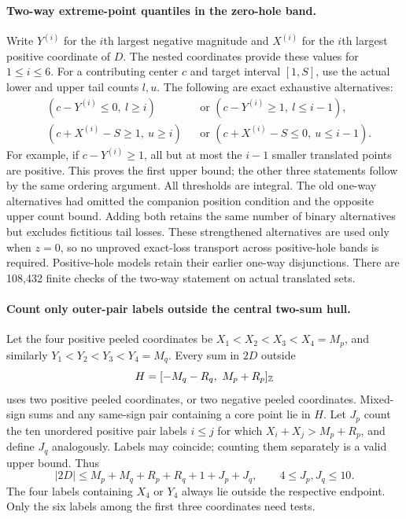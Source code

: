 \documentclass[11pt,a4paper]{article}
\begin{document}
\paragraph{Two-way extreme-point quantiles in the zero-hole band.}
Write $Y^{(i)}$ for the $i$th largest negative magnitude and $X^{(i)}$
for the $i$th largest positive coordinate of $D$. The nested coordinates
provide these values for $1\le i\le6$. For a contributing center $c$ and
target interval $[1,S]$, use the actual lower and upper tail counts $l,u$.
The following are exact exhaustive alternatives:
\begin{align*}
 &(c-Y^{(i)}\le0,\ l\ge i)
       &&\text{or }(c-Y^{(i)}\ge1,\ l\le i-1),\\
 &(c+X^{(i)}-S\ge1,\ u\ge i)
       &&\text{or }(c+X^{(i)}-S\le0,\ u\le i-1).
\end{align*}
For example, if $c-Y^{(i)}\ge1$, all but at most the $i-1$ smaller
translated points are positive. This proves the first upper bound; the
other three statements follow by the same ordering argument. All thresholds
are integral. The old one-way alternatives had omitted the companion
position condition and the opposite upper count bound. Adding both retains
the same number of binary alternatives but excludes fictitious tail losses.
These strengthened alternatives are used only when $z=0$, so no unproved
exact-loss transport across positive-hole bands is required. Positive-hole
models retain their earlier one-way disjunctions. There are 108,432 finite
checks of the two-way statement on actual translated sets.

\paragraph{Count only outer-pair labels outside the central two-sum hull.}
Let the four positive peeled coordinates be $X_1<X_2<X_3<X_4=M_p$,
and similarly $Y_1<Y_2<Y_3<Y_4=M_q$. Every sum in $2D$ outside
\[
 H=[-M_q-R_q,\ M_p+R_p]_{\Z}
\]
uses two positive peeled coordinates, or two negative peeled coordinates.
Mixed-sign sums and any same-sign pair containing a core point lie in $H$.
Let $J_p$ count the ten unordered positive pair labels $i\le j$ for which
$X_i+X_j>M_p+R_p$, and define $J_q$ analogously. Labels may coincide;
counting them separately is a valid upper bound. Thus
\[
 |2D|\le M_p+M_q+R_p+R_q+1+J_p+J_q,\qquad 4\le J_p,J_q\le10.
\]
The four labels containing $X_4$ or $Y_4$ always lie outside the respective
endpoint. Only the six labels among the first three coordinates need tests.
\end{document}
